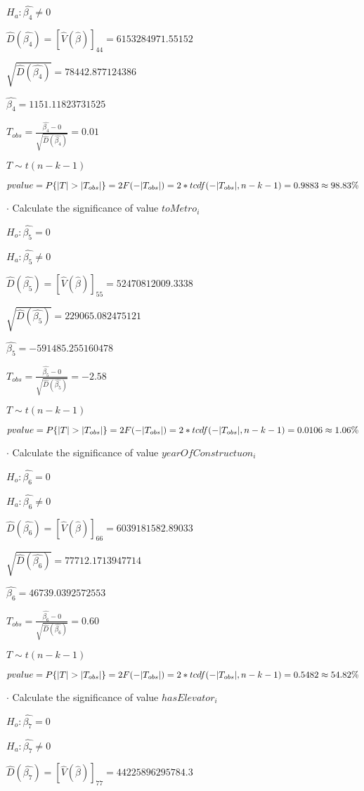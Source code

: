 \documentclass{article}
\begin{document}
$H_a: \hat{\beta_4}\neq0$

$\hat{D}(\hat{\beta_4})=[\hat{V}(\hat{\beta})]_{4 4}=6153284971.55152$

$\sqrt{\hat{D}(\hat{\beta_4})}=78442.877124386$

$\hat{\beta_4}=1151.11823731525$

$T_{obs}=\frac{\hat{\beta_4}-0}{\sqrt{\hat{D}(\hat{\beta_4})}}=0.01$

$T\sim t(n-k-1)$

$pvalue=P\{|T|>|T_{obs}|\}=2F(-|T_{obs}|)=2*tcdf(-|T_{obs}|, n-k-1)=0.9883\approx98.83\%\bigskip$

$\cdot$ Calculate the significance of value $toMetro_i$

$H_o: \hat{\beta_5}=0$

$H_a: \hat{\beta_5}\neq0$

$\hat{D}(\hat{\beta_5})=[\hat{V}(\hat{\beta})]_{5 5}=52470812009.3338$

$\sqrt{\hat{D}(\hat{\beta_5})}=229065.082475121$

$\hat{\beta_5}=-591485.255160478$

$T_{obs}=\frac{\hat{\beta_5}-0}{\sqrt{\hat{D}(\hat{\beta_5})}}=-2.58$

$T\sim t(n-k-1)$

$pvalue=P\{|T|>|T_{obs}|\}=2F(-|T_{obs}|)=2*tcdf(-|T_{obs}|, n-k-1)=0.0106\approx1.06\%\bigskip$

$\cdot$ Calculate the significance of value $yearOfConstructuon_i$

$H_o: \hat{\beta_6}=0$

$H_a: \hat{\beta_6}\neq0$

$\hat{D}(\hat{\beta_6})=[\hat{V}(\hat{\beta})]_{6 6}=6039181582.89033$

$\sqrt{\hat{D}(\hat{\beta_6})}=77712.1713947714$

$\hat{\beta_6}=46739.0392572553$

$T_{obs}=\frac{\hat{\beta_6}-0}{\sqrt{\hat{D}(\hat{\beta_6})}}=0.60$

$T\sim t(n-k-1)$

$pvalue=P\{|T|>|T_{obs}|\}=2F(-|T_{obs}|)=2*tcdf(-|T_{obs}|, n-k-1)=0.5482\approx54.82\%\bigskip$

$\cdot$ Calculate the significance of value $hasElevator_i$

$H_o: \hat{\beta_7}=0$

$H_a: \hat{\beta_7}\neq0$

$\hat{D}(\hat{\beta_7})=[\hat{V}(\hat{\beta})]_{7 7}=44225896295784.3$
\end{document}
